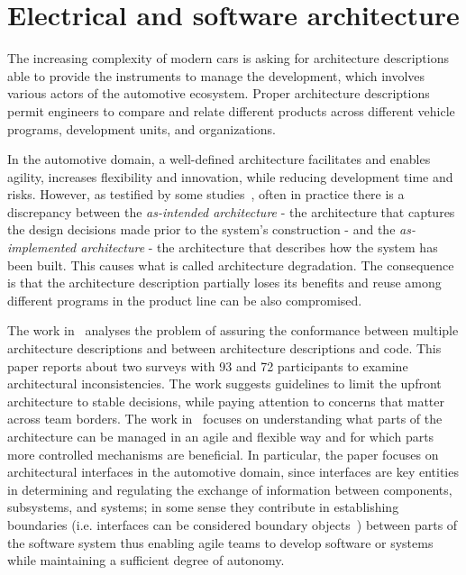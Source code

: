 \section{Electrical and software architecture}\label{sec:architecture}


The increasing complexity of modern cars is asking for architecture descriptions able to provide the instruments to manage the development, which involves various actors of the automotive ecosystem. Proper architecture descriptions permit engineers to compare and relate different products across different vehicle programs, development units, and organizations. 

In the automotive domain, a well-defined architecture facilitates and enables agility, increases flexibility and innovation, while reducing development time and risks. However, as testified by some studies~\cite{Models2016,WICSA2015,JSA2017},
often in practice there is a discrepancy between the {\em as-intended architecture} - the architecture that captures the design decisions made
prior to the system's construction - and the {\em as-implemented 
architecture} - the architecture that describes how
the system has been built. This causes what is called architecture degradation. The consequence is that the architecture description partially loses its benefits and reuse among different programs in the product line can be also compromised. 

The work in~\cite{ICSA2019Survey} analyses the problem of assuring the conformance between multiple architecture descriptions and between architecture descriptions and code. This paper reports about two surveys with 93 and 72 participants
to examine architectural inconsistencies. 
The work suggests guidelines to limit the upfront architecture to stable decisions, while paying attention to concerns that matter across team borders.
The work in~\cite{ICSA2019Interfaces} focuses on understanding what
parts of the architecture can be managed in an agile and flexible way and for which parts more controlled mechanisms are beneficial. In particular, the paper focuses on architectural interfaces in the automotive domain, since interfaces are key
entities in determining and regulating the exchange
of information between components, subsystems, and
systems; in some sense they contribute in establishing boundaries (i.e. interfaces can be considered boundary objects~\cite{WohlrabPKL18}) between parts of the software system thus enabling agile teams to develop software or systems while maintaining a sufficient
degree of autonomy. 

